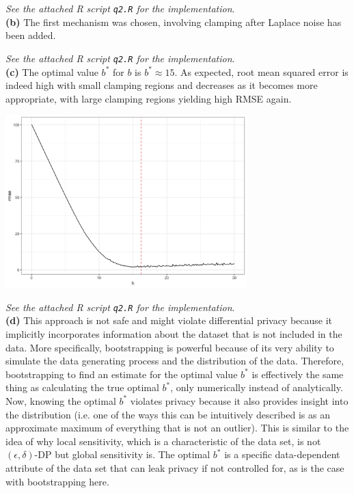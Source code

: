 \documentclass[12pt]{article}
\begin{document}
\emph{See the attached R script \texttt{q2.R} for the implementation}.\\

\textbf{(b)} The first mechanism was chosen, involving clamping after Laplace noise has been added.

\emph{See the attached R script \texttt{q2.R} for the implementation}.\\

\textbf{(c)} The optimal value $b^*$ for $b$ is $\boxed{b^* \approx 15}$. As expected, root mean squared error is indeed high with small clamping regions and decreases as it becomes more appropriate, with large clamping regions yielding high RMSE again.

\begin{center}
\includegraphics[width=0.7\textwidth]{clamping}
\end{center}

\emph{See the attached R script \texttt{q2.R} for the implementation}.\\

\textbf{(d)} This approach is not safe and might violate differential privacy because it implicitly incorporates information about the dataset that is not included in the data. More specifically, bootstrapping is powerful because of its very ability to simulate the data generating process and the distribution of the data. Therefore, bootstrapping to find an estimate for the optimal value $b^*$ is effectively the same thing as calculating the true optimal $b^*$, only numerically instead of analytically. Now, knowing the optimal $b^*$ violates privacy because it also provides insight into the distribution (i.e. one of the ways this can be intuitively described is as an approximate maximum of everything that is not an outlier). This is similar to the idea of why local sensitivity, which is a characteristic of the data set, is not $(\epsilon, \delta)$-DP but global sensitivity is. The optimal $b^*$ is a specific data-dependent attribute of the data set that can leak privacy if not controlled for, as is the case with bootstrapping here.\\
\end{document}

